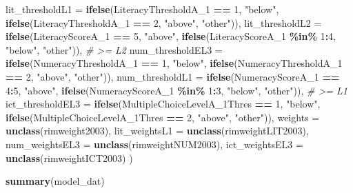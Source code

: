 \documentclass[
]{article}
\newenvironment{Shaded}{\begin{snugshade}}{\end{snugshade}}
\newcommand{\AttributeTok}[1]{\textcolor[rgb]{0.13,0.29,0.53}{#1}}
\newcommand{\CommentTok}[1]{\textcolor[rgb]{0.56,0.35,0.01}{\textit{#1}}}
\newcommand{\DecValTok}[1]{\textcolor[rgb]{0.00,0.00,0.81}{#1}}
\newcommand{\FunctionTok}[1]{\textcolor[rgb]{0.13,0.29,0.53}{\textbf{#1}}}
\newcommand{\NormalTok}[1]{#1}
\newcommand{\SpecialCharTok}[1]{\textcolor[rgb]{0.81,0.36,0.00}{\textbf{#1}}}
\newcommand{\StringTok}[1]{\textcolor[rgb]{0.31,0.60,0.02}{#1}}
\begin{document}
\begin{Shaded}
\begin{Highlighting}[]
    \AttributeTok{lit\_thresholdL1 =}
      \FunctionTok{ifelse}\NormalTok{(LiteracyThresholdA\_1 }\SpecialCharTok{==} \DecValTok{1}\NormalTok{, }\StringTok{"below"}\NormalTok{,}
             \FunctionTok{ifelse}\NormalTok{(LiteracyThresholdA\_1 }\SpecialCharTok{==} \DecValTok{2}\NormalTok{, }\StringTok{"above"}\NormalTok{, }\StringTok{"other"}\NormalTok{)),}
    \AttributeTok{lit\_thresholdL2 =} \FunctionTok{ifelse}\NormalTok{(LiteracyScoreA\_1 }\SpecialCharTok{==} \DecValTok{5}\NormalTok{, }\StringTok{"above"}\NormalTok{,}
                           \FunctionTok{ifelse}\NormalTok{(LiteracyScoreA\_1 }\SpecialCharTok{\%in\%} \DecValTok{1}\SpecialCharTok{:}\DecValTok{4}\NormalTok{, }\StringTok{"below"}\NormalTok{, }\StringTok{"other"}\NormalTok{)),   }\CommentTok{\# \textgreater{}= L2}
    \AttributeTok{num\_thresholdEL3 =}
      \FunctionTok{ifelse}\NormalTok{(NumeracyThresholdA\_1 }\SpecialCharTok{==} \DecValTok{1}\NormalTok{, }\StringTok{"below"}\NormalTok{,}
             \FunctionTok{ifelse}\NormalTok{(NumeracyThresholdA\_1 }\SpecialCharTok{==} \DecValTok{2}\NormalTok{, }\StringTok{"above"}\NormalTok{, }\StringTok{"other"}\NormalTok{)),}
    \AttributeTok{num\_thresholdL1 =} \FunctionTok{ifelse}\NormalTok{(NumeracyScoreA\_1 }\SpecialCharTok{==} \DecValTok{4}\SpecialCharTok{:}\DecValTok{5}\NormalTok{, }\StringTok{"above"}\NormalTok{,}
                           \FunctionTok{ifelse}\NormalTok{(NumeracyScoreA\_1 }\SpecialCharTok{\%in\%} \DecValTok{1}\SpecialCharTok{:}\DecValTok{3}\NormalTok{, }\StringTok{"below"}\NormalTok{, }\StringTok{"other"}\NormalTok{)),  }\CommentTok{\# \textgreater{}= L1}
    \AttributeTok{ict\_thresholdEL3 =}
      \FunctionTok{ifelse}\NormalTok{(MultipleChoiceLevelA\_1Thres }\SpecialCharTok{==} \DecValTok{1}\NormalTok{, }\StringTok{"below"}\NormalTok{,}
             \FunctionTok{ifelse}\NormalTok{(MultipleChoiceLevelA\_1Thres }\SpecialCharTok{==} \DecValTok{2}\NormalTok{, }\StringTok{"above"}\NormalTok{, }\StringTok{"other"}\NormalTok{)),}
    \AttributeTok{weights =} \FunctionTok{unclass}\NormalTok{(rimweight2003),}
    \AttributeTok{lit\_weightsL1 =} \FunctionTok{unclass}\NormalTok{(rimweightLIT2003),}
    \AttributeTok{num\_weightsEL3 =} \FunctionTok{unclass}\NormalTok{(rimweightNUM2003),}
    \AttributeTok{ict\_weightsEL3 =} \FunctionTok{unclass}\NormalTok{(rimweightICT2003)}
\NormalTok{  )}

\FunctionTok{summary}\NormalTok{(model\_dat)}
\end{Highlighting}
\end{Shaded}
\end{document}
